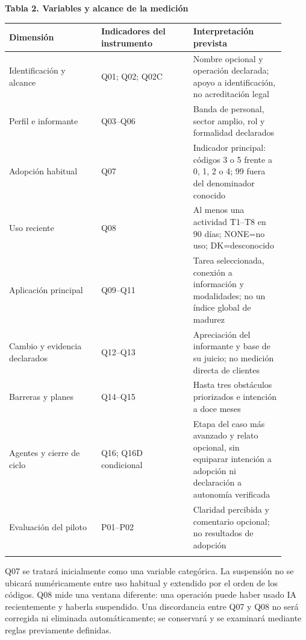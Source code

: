 \documentclass[12pt,letterpaper]{article}
\begin{document}
\noindent \textbf{Tabla 2. Variables y alcance de la medición}\par\nopagebreak
\begingroup\small{}\setlength{\tabcolsep}{4pt}\begin{longtable}{>{\raggedright\arraybackslash}p{0.303\linewidth}>{\raggedright\arraybackslash}p{0.303\linewidth}>{\raggedright\arraybackslash}p{0.303\linewidth}}
\toprule
\textbf{Dimensión} & \textbf{Indicadores del instrumento} & \textbf{Interpretación prevista} \\ \midrule\endhead
Identificación y alcance & Q01; Q02; Q02C & Nombre opcional y operación declarada; apoyo a identificación, no acreditación legal \\ \addlinespace[5pt]
Perfil e informante & Q03--Q06 & Banda de personal, sector amplio, rol y formalidad declarados \\ \addlinespace[5pt]
Adopción habitual & Q07 & Indicador principal: códigos 3 o 5 frente a 0, 1, 2 o 4; 99 fuera del denominador conocido \\ \addlinespace[5pt]
Uso reciente & Q08 & Al menos una actividad T1--T8 en 90 días; NONE=no uso; DK=desconocido \\ \addlinespace[5pt]
Aplicación principal & Q09--Q11 & Tarea seleccionada, conexión a información y modalidades; no un índice global de madurez \\ \addlinespace[5pt]
Cambio y evidencia declarados & Q12--Q13 & Apreciación del informante y base de su juicio; no medición directa de clientes \\ \addlinespace[5pt]
Barreras y planes & Q14--Q15 & Hasta tres obstáculos priorizados e intención a doce meses \\ \addlinespace[5pt]
Agentes y cierre de ciclo & Q16; Q16D condicional & Etapa del caso más avanzado y relato opcional, sin equiparar intención a adopción ni declaración a autonomía verificada \\ \addlinespace[5pt]
Evaluación del piloto & P01--P02 & Claridad percibida y comentario opcional; no resultados de adopción \\ \addlinespace[5pt]
\bottomrule\end{longtable}\endgroup
Q07 se tratará inicialmente como una variable categórica. La suspensión no se ubicará numéricamente entre uso habitual y extendido por el orden de los códigos. Q08 mide una ventana diferente: una operación puede haber usado IA recientemente y haberla suspendido. Una discordancia entre Q07 y Q08 no será corregida ni eliminada automáticamente; se conservará y se examinará mediante reglas previamente definidas.
\end{document}
